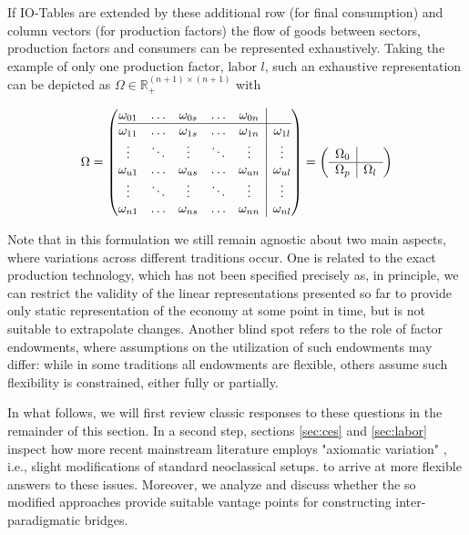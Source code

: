 If IO-Tables are extended by these additional row (for final consumption) and column vectors (for production factors) the flow of goods between sectors, production factors and consumers can be represented exhaustively. 
Taking the example of only one production factor, labor $l$, such an exhaustive representation can be depicted as $\Omega \in \mathbb R^{(n+1) \times (n+1)}_+$ with

\begin{align}
  \label{eq:iomatrix}
  \Omega = \left( \begin{array}{@{}ccccc|c@{}}
    \omega_{01} &\dots &\omega_{0s} &\dots &\omega_{0n} &  \\ \hline
    \omega_{11} & \dots & \omega_{1s} & \dots &\omega_{1n} & \omega_{1l}\\ 
    \vdots &\ddots &\vdots  &\ddots & \vdots & \vdots\\ 
    \omega_{u1} & \dots & \omega_{us} & \dots &\omega_{un} & \omega_{ul}\\ 
    \vdots &\ddots &\vdots  &\ddots & \vdots & \vdots\\ 
    \omega_{n1} & \dots &\omega_{ns} & \dots & \omega_{nn} & \omega_{nl}    
    \end{array} \right) = 
    \left( \begin{array}{c|c}
    \Omega_0 & \\ \hline
    \Omega_p & \Omega_l\\ 
  \end{array} \right)
\end{align}

Note that in this formulation we still remain agnostic about two main aspects, where variations across different traditions occur. One is related to the exact production technology, which has not been specified precisely as, in principle, we can restrict the validity of the linear representations presented so far to provide only static representation of the economy at some point in time, but is not suitable to extrapolate changes. Another blind spot refers to the role of factor endowments, where assumptions on the utilization of such endowments may differ: while in some traditions all endowments are flexible, others assume such flexibility is constrained, either fully or partially. 

In what follows, we will first review classic responses to these questions in the remainder of this section. In a second step, sections \ref{sec:ces} and \ref{sec:labor}  inspect how more recent mainstream literature employs "axiomatic variation" \citep{Kapeller.2013}, i.e., slight modifications of standard neoclassical setups. to arrive at more flexible answers to these issues. Moreover, we analyze and discuss whether the so modified approaches provide suitable vantage points for constructing inter-paradigmatic bridges.

